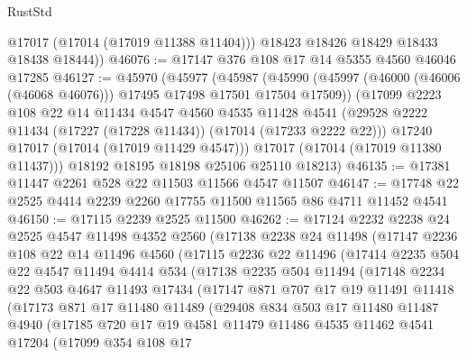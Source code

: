 \begin{lexlean}{RustStd}
\begin{coremodule}
          @17017
          (@17014 (@17019 @11388 @11404)))
        @18423
        @18426
        @18429
        @18433
        @18438
        @18444))
@46076 := @17147 @376 @108 @17 @14 @5355 @4560 @46046 @17285
@46127 := @45970
    (@45977
      (@45987
        (@45990 (@45997 (@46000 (@46006 (@46068 @46076))) @17495 @17498 @17501 @17504 @17509))
        (@17099
          @2223
          @108
          @22
          @14
          @11434
          @4547
          @4560
          @4535
          @11428
          @4541
          (@29528 @2222 @11434 (@17227 (@17228 @11434)) (@17014 (@17233 @2222 @22)))
          @17240
          @17017
          (@17014 (@17019 @11429 @4547)))
        @17017
        (@17014 (@17019 @11380 @11437)))
      @18192
      @18195
      @18198
      @25106
      @25110
      @18213)
@46135 := @17381 @11447 @2261 @528 @22 @11503 @11566 @4547 @11507
@46147 := @17748 @22 @2525 @4414 @2239 @2260 @17755 @11500 @11565 @86 @4711 @11452 @4541
@46150 := @17115 @2239 @2525 @11500
@46262 := @17124
    @2232
    @2238
    @24
    @2525
    @4547
    @11498
    @4352
    @2560
    (@17138
      @2238
      @24
      @11498
      (@17147
        @2236
        @108
        @22
        @14
        @11496
        @4560
        (@17115
          @2236
          @22
          @11496
          (@17414
            @2235
            @504
            @22
            @4547
            @11494
            @4414
            @534
            (@17138
              @2235
              @504
              @11494
              (@17148
                @2234
                @22
                @503
                @4647
                @11493
                @17434
                (@17147
                  @871
                  @707
                  @17
                  @19
                  @11491
                  @11418
                  (@17173
                    @871
                    @17
                    @11480
                    @11489
                    (@29408
                      @834
                      @503
                      @17
                      @11480
                      @11487
                      @4940
                      (@17185
                        @720
                        @17
                        @19
                        @4581
                        @11479
                        @11486
                        @4535
                        @11462
                        @4541
                        @17204
                        (@17099
                          @354
                          @108
                          @17

\end{coremodule}
\end{lexlean}
